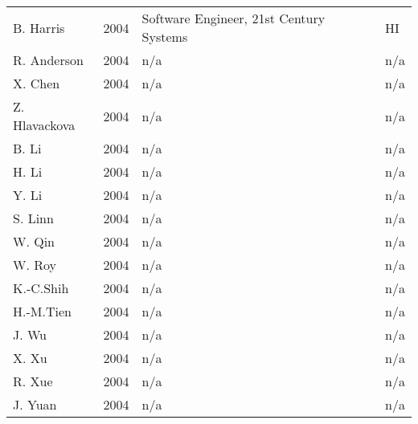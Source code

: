 \documentclass[12pt]{article}
\begin{document}
\begin{table}[Htb]
\begin{tabular}{|l|l|l|l|}
B. Harris   & 2004 & Software Engineer, 21st Century Systems & HI\\
R. Anderson & 2004 & n/a & n/a\\
X. Chen     & 2004 & n/a & n/a\\
Z. Hlavackova  & 2004 & n/a & n/a\\
B. Li       & 2004 & n/a & n/a\\
H. Li      & 2004 & n/a & n/a\\
Y. Li      & 2004 & n/a & n/a\\
S. Linn    & 2004 & n/a & n/a\\
W. Qin     & 2004 & n/a & n/a\\
W. Roy     & 2004 & n/a & n/a\\
K.-C.Shih  & 2004 & n/a & n/a\\ 
H.-M.Tien  & 2004 & n/a & n/a\\
J. Wu      & 2004 & n/a & n/a\\
X. Xu      & 2004 & n/a & n/a\\
R. Xue     & 2004 & n/a & n/a\\
J. Yuan    & 2004 & n/a & n/a\\
\hline
\end{tabular}
\end{table}
\end{document}
